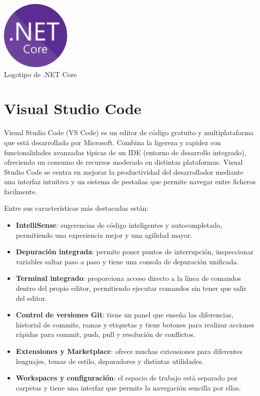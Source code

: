  
\begin{center}
  \includegraphics[width=0.25\textwidth]{img/net-logo.png}\\
  \small Logotipo de .NET Core
\end{center}


\section{Visual Studio Code}\label{visual-studio-code}

Visual Studio Code (VS Code) es un editor de código gratuito y multiplataforma que está desarrollado por Microsoft. Combina la ligereza y rapidez con funcionalidades avanzadas típicas de un IDE (entorno de desarrollo integrado), ofreciendo un consumo de recursos moderado en distintas plataformas. Visual Studio Code se centra en mejorar la productividad del desarrollador mediante una interfaz intuitiva y un sistema de pestañas que permite navegar entre ficheros facilmente.

Entre sus características más destacadas están:
\begin{itemize}
  \item \textbf{IntelliSense}: sugerencias de código inteligentes y autocompletado, permitiendo una experiencia mejor y una agilidad mayor. 
  \item \textbf{Depuración integrada}: permite poner puntos de interrupción, inspeccionar variables saltar paso a paso y tiene una consola de depuración unificada.
  \item \textbf{Terminal integrado}: proporciona acceso directo a la línea de comandos dentro del propio editor, permitiendo ejecutar comandos sin tener que salir del editor.  
  \item \textbf{Control de versiones Git}: tiene un panel que enseña las diferencias, historial de commits, ramas y etiquetas y tiene botones para realizar acciones rápidas para commit, push, pull y resolución de conflictos.  
  \item \textbf{Extensiones y Marketplace}: ofrece muchas extensiones para diferentes lenguajes, temas de estilo, depuradores y distintas utilidades.  
  \item \textbf{Workspaces y configuración}: el espacio de trabajo está separado por carpetas y tiene una interfaz que permite la navegación sencilla por ellas.  
\end{itemize}

